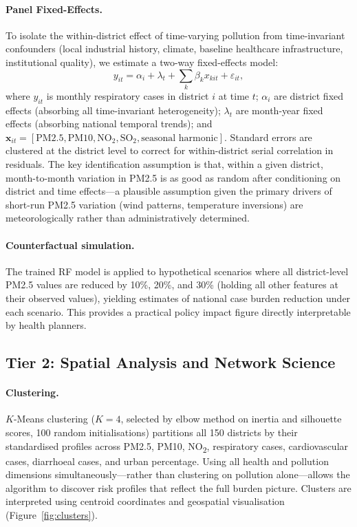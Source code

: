 \documentclass{article}
\begin{document}
\paragraph{Panel Fixed-Effects.}
To isolate the within-district effect of time-varying pollution from time-invariant
confounders (local industrial history, climate, baseline healthcare infrastructure,
institutional quality), we estimate a two-way fixed-effects model:
\[
  y_{it} = \alpha_i + \lambda_t + \sum_k \beta_k x_{kit} + \varepsilon_{it},
\]
where $y_{it}$ is monthly respiratory cases in district $i$ at time $t$;
$\alpha_i$ are district fixed effects (absorbing all time-invariant heterogeneity);
$\lambda_t$ are month-year fixed effects (absorbing national temporal trends);
and $\mathbf{x}_{it} = [\text{PM2.5}, \text{PM10}, \text{NO}_2, \text{SO}_2,
\text{seasonal harmonic}]$. Standard errors are clustered at the district level to
correct for within-district serial correlation in residuals. The key identification
assumption is that, within a given district, month-to-month variation in PM2.5 is as
good as random after conditioning on district and time effects---a plausible assumption
given the primary drivers of short-run PM2.5 variation (wind patterns, temperature
inversions) are meteorologically rather than administratively determined.

\paragraph{Counterfactual simulation.}
The trained RF model is applied to hypothetical scenarios where all district-level PM2.5
values are reduced by 10\%, 20\%, and 30\% (holding all other features at their observed
values), yielding estimates of national case burden reduction under each scenario. This
provides a practical policy impact figure directly interpretable by health planners.

\subsection{Tier 2: Spatial Analysis and Network Science}

\paragraph{Clustering.}
$K$-Means clustering ($K = 4$, selected by elbow method on inertia and silhouette scores,
100 random initialisations) partitions all 150 districts by their standardised profiles
across PM2.5, PM10, NO\textsubscript{2}, respiratory cases, cardiovascular cases,
diarrhoeal cases, and urban percentage. Using all health and pollution dimensions
simultaneously---rather than clustering on pollution alone---allows the algorithm to
discover risk profiles that reflect the full burden picture. Clusters are interpreted
using centroid coordinates and geospatial visualisation (Figure~\ref{fig:clusters}).
\end{document}
